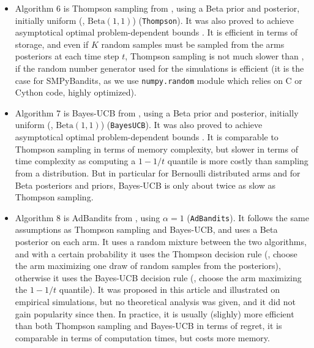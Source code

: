 \begin{itemize}
    \item Algorithm 6 is
    Thompson sampling from \cite{Kaufmann12Thompson}, using a Beta prior and posterior, initially uniform (\ie, $\mathrm{Beta}(1,1)$) (\texttt{Thompson}).
    It was also proved to achieve asymptotical optimal problem-dependent bounds \cite{Kaufmann12Thompson,AgrawalGoyal11}.
    It is efficient in terms of storage, and even if $K$ random samples must be sampled from the arms posteriors at each time step $t$, Thompson sampling is not much slower than \UCB, if the random number generator used for the simulations is efficient (it is the case for SMPyBandits, as we use \texttt{numpy.random} module which relies on C or Cython code, highly optimized).

    \item Algorithm 7 is
    Bayes-UCB from \cite{Kaufmann12BUCB}, using a Beta prior and posterior, initially uniform (\ie, $\mathrm{Beta}(1,1)$) (\texttt{BayesUCB}).
    It was also proved to achieve asymptotical optimal problem-dependent bounds \cite{Kaufmann12BUCB}.
    It is comparable to Thompson sampling in terms of memory complexity, but slower in terms of time complexity as computing a $1-1/t$ quantile is more costly than sampling from a distribution.
    But in particular for Bernoulli distributed arms and for Beta posteriors and priors, Bayes-UCB is only about twice as slow as Thompson sampling.

    \item Algorithm 8 is
    AdBandits from \cite{Truzzi13}, using $\alpha=1$ (\texttt{AdBandits}).
    It follows the same assumptions as Thompson sampling and Bayes-UCB, and uses a Beta posterior on each arm. It uses a random mixture between the two algorithms, and with a certain probability it uses the Thompson decision rule (\ie, choose the arm maximizing one draw of random samples from the posteriors), otherwise it uses the Bayes-UCB decision rule (\ie, choose the arm maximizing the $1-1/t$ quantile).
    It was proposed in this article \cite{Truzzi13} and illustrated on empirical simulations, but no theoretical analysis was given, and it did not gain popularity since then.
    In practice, it is usually (slighly) more efficient than both Thompson sampling and Bayes-UCB in terms of regret, it is comparable in terms of computation times, but costs more memory.


\end{itemize}

